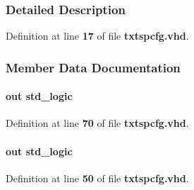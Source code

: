 \subsubsection{Detailed Description}


Definition at line {\bf 17} of file {\bf txtspcfg.\+vhd}.



\subsubsection{Member Data Documentation}
\paragraph[{drct\+\_\+clk\+\_\+en}]{ {\bfseries \textcolor{keywordflow}{out}\textcolor{vhdlchar}{ }} {\bfseries \textcolor{comment}{std\+\_\+logic}\textcolor{vhdlchar}{ }} \hspace{0.3cm}{\ttfamily [Port]}}\label{classtxtspcfg_a9110b02eff4af7569945a9a529ee1dd1}


Definition at line {\bf 70} of file {\bf txtspcfg.\+vhd}.

\paragraph[{fx3\+\_\+reset}]{ {\bfseries \textcolor{keywordflow}{out}\textcolor{vhdlchar}{ }} {\bfseries \textcolor{comment}{std\+\_\+logic}\textcolor{vhdlchar}{ }} \hspace{0.3cm}{\ttfamily [Port]}}\label{classtxtspcfg_a8de53eb344cb2be2001d43bad134a250}


Definition at line {\bf 50} of file {\bf txtspcfg.\+vhd}.

\paragraph[{ieee}]{\hspace{0.3cm}{\ttfamily [Library]}}\label{classtxtspcfg_a0a6af6eef40212dbaf130d57ce711256}


